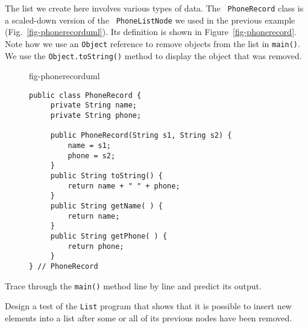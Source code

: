 
The list we create here involves various types of data.  The {\tt
Phone\-Record} class is a scaled-down version of the {\tt
PhoneListNode} we used in the previous example
(Fig.~\ref{fig-phonerecorduml}).  Its definition is shown in
Figure~\ref{fig-phonerecord}.  Note how we use an {\tt Object}
reference to remove objects from the list in {\tt main()}.  We use the
{\tt Object.toString()} method to display the object that was removed.

\begin{figure}[bht]
 {fig-phonerecorduml}
\end{figure}

\begin{figure}[htb]
\jjjprogstart
\begin{jjjlisting}
\begin{lstlisting}
public class PhoneRecord {
     private String name;
     private String phone;

     public PhoneRecord(String s1, String s2) {
         name = s1;
         phone = s2;
     }
     public String toString() {
         return name + " " + phone;
     }
     public String getName( ) {
         return name;
     }
     public String getPhone( ) {
         return phone;
     }
} // PhoneRecord
\end{lstlisting}
\end{jjjlisting}
\end{figure}

\pagebreak
{}
\begin{SSTUDY}

\item  Trace through the {\tt main()} 
method line by line and predict its
output.

\item  Design a test of the {\tt List} program that shows that
it is possible to insert new elements into a list after
some or all of its previous nodes have been removed.
\end{SSTUDY}


